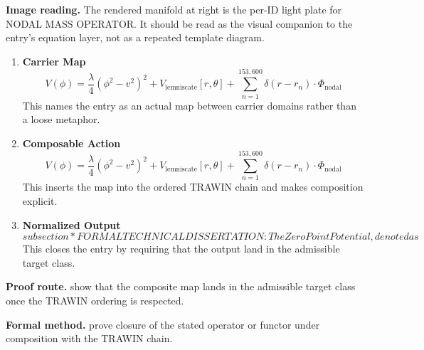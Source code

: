 \begin{samepage}
\noindent\begin{minipage}[t]{0.45\linewidth}
\vspace{0pt}
\raggedright
\scriptsize\textbf{Image reading.} The rendered manifold at right is the per-ID light plate for NODAL MASS OPERATOR. It should be read as the visual companion to the entry's equation layer, not as a repeated template diagram.\par
\end{minipage}\hfill
\begin{minipage}[t]{0.53\linewidth}
\vspace*{-0.10in}
\raggedright
{}
\end{minipage}
\end{samepage}

\clearpage


\begin{enumerate}[leftmargin=1.6em,itemsep=9pt,topsep=6pt]
\item \textbf{Carrier Map}
\[
V(\phi) = \frac{\lambda}{4}(\phi^2 - v^2)^2 + V_{\text{lemniscate}}[r, \theta] + \sum_{n=1}^{153,600} \delta(r - r_n) \cdot \Phi_{\text{nodal}}
\]
This names the entry as an actual map between carrier domains rather than a loose metaphor.

\item \textbf{Composable Action}
\[
V(\phi) = \frac{\lambda}{4}(\phi^2 - v^2)^2 + V_{\text{lemniscate}}[r, \theta] + \sum_{n=1}^{153,600} \delta(r - r_n) \cdot \Phi_{\text{nodal}}
\]
This inserts the map into the ordered TRAWIN chain and makes composition explicit.

\item \textbf{Normalized Output}
\[
subsection*{FORMAL TECHNICAL DISSERTATION:}The Zero Point Potential, denoted as
\]
This closes the entry by requiring that the output land in the admissible target class.
\end{enumerate}

\textbf{Proof route.} show that the composite map lands in the admissible target class once the TRAWIN ordering is respected.

\textbf{Formal method.} prove closure of the stated operator or functor under composition with the TRAWIN chain.

\medskip
{}

